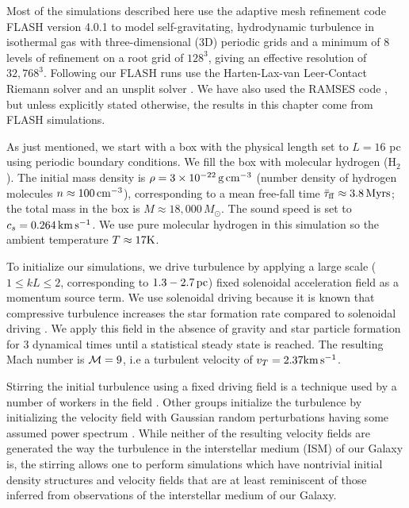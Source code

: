 \documentclass[../dissertation.tex]{subfiles}
\begin{document}
Most of the simulations described here use the adaptive mesh refinement code FLASH version 4.0.1 
\citep{2000ApJS..131..273F, 2008ASPC..385..145D} to model self-gravitating, hydrodynamic turbulence in isothermal gas with three-dimensional (3D) periodic grids and a minimum of 8 levels of refinement on a root grid of $128^3$, 
giving an effective resolution of $32,768^3$.  
Following \citet{2015ApJ...800...49L} our FLASH runs use the Harten-Lax-van Leer-Contact 
Riemann solver and an unsplit solver \citep{2009ASPC..406..243L}. We have also used the RAMSES code \citep{2002A&A...385..337T}, but unless explicitly stated otherwise, the results in this chapter come from FLASH simulations.

As just mentioned, we start with a box with the physical length set to $L = 16$ pc using 
periodic boundary conditions. 
We fill the box with molecular hydrogen (H$_2$). 
The initial mass density is 
$\rho = 3\times10^{-22}\,{\rm g\,cm}^{-3}$ (number density of hydrogen molecules $n \approx 100\,{\rm cm}^{-3}$), 
corresponding to a mean 
free-fall time $\bar\tau_{\rm ff}\approx3.8\,{\rm Myrs}$; the total mass in the
box is $M\approx 18,000\,M_\odot$.
The sound speed is set to $c_s = 0.264\,{\rm km\,s^{-1}}$.
We use pure molecular hydrogen in this simulation so the ambient 
temperature $T \approx 17 {\rm K}$.

To initialize our simulations, we drive turbulence by applying a large scale 
($1 \le kL \le 2$, corresponding to $1.3 - 2.7 \, {\rm pc}$) fixed solenoidal acceleration field as a momentum
source term. 
We use solenoidal driving because it is known that compressive turbulence increases the star formation rate compared to solenoidal driving \citep{2008ApJ...688L..79F}.
We apply this field in the absence of gravity and star particle formation for 3 dynamical times until a statistical steady state is reached.
The resulting Mach number is ${\cal M} = 9$, i.e a turbulent velocity of $v_T = 2.37 {\rm km \, s^{-1}}$.

Stirring the initial turbulence using a fixed driving field is a
technique used by a number of workers in the field
\citep{2011ApJ...730...40P,2011ApJ...731...59C}.  Other groups
initialize the turbulence by initializing the velocity field with
Gaussian random perturbations having some assumed power spectrum
\citep{2014MNRAS.439.3420M,2015ApJ...809..187S}.  While neither of the
resulting velocity fields are generated the way the turbulence in the
interstellar medium (ISM) of our Galaxy is, the stirring allows one to
perform simulations which have nontrivial initial density structures
and velocity fields that are at least reminiscent of those inferred
from observations of the interstellar medium of our Galaxy.
\end{document}
